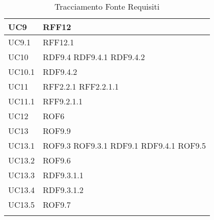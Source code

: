 \documentclass[../AnalisideiRequisiti.tex]{subfiles}
\begin{document}
\begin{longtable}{| p{4cm} | p{4cm} |}
		\hline
		\newline UC9 &  \newline RFF12 \\[1em]
		\hline
		\newline UC9.1 &  \newline RFF12.1 \\[1em]
		\hline
		\newline UC10 &  \newline RDF9.4 \newline RDF9.4.1 \newline RDF9.4.2 \\[1em]
		\hline
		\newline UC10.1 &  \newline RDF9.4.2 \\[1em]
		\hline
		\newline UC11 &  \newline RFF2.2.1 \newline RFF2.2.1.1\\[1em]
		\hline
		\newline UC11.1 &  \newline RFF9.2.1.1 \\[1em]
		\hline
		\newline UC12 &  \newline ROF6 \\[1em]
		\hline			
		\newline UC13 &  \newline ROF9.9 \\[1em]
		\hline			
		\newline UC13.1 &  \newline ROF9.3 \newline ROF9.3.1 \newline RDF9.1 \newline RDF9.4.1 \newline ROF9.5 \\[1em]
		\hline
		\newline UC13.2 &  \newline ROF9.6 \\[1em]
		\hline
		\newline UC13.3 &   \newline RDF9.3.1.1 \\[1em]
		\hline
		\newline UC13.4 &  \newline RDF9.3.1.2 \\[1em]
		\hline
		\newline UC13.5 &  \newline ROF9.7 \\[1em]
		\hline
		
		\caption{Tracciamento Fonte Requisiti}
	\end{longtable}
\newpage
\end{document}
